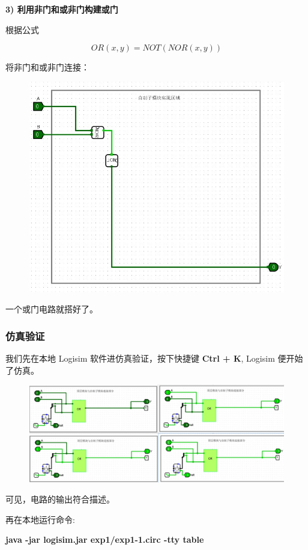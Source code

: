 \documentclass[UTF8]{ctexart}
\begin{document}
\textbf{3) 利用非门和或非门构建或门}

根据公式

\[
    OR(x, y) = NOT(NOR(x, y))
\]

将非门和或非门连接：

\begin{figure}[H]
    \centering
    \includegraphics[width = .6\textwidth]{images/or.jpg}
\end{figure}

一个或门电路就搭好了。


\subsubsection{仿真验证}

我们先在本地 Logisim 软件进仿真验证，按下快捷键 \textbf{Ctrl + K}, Logisim 便开始了仿真。

\begin{figure}[H]
    \centering
    \includegraphics[width = \textwidth]{images/sim.jpg}
\end{figure}

可见，电路的输出符合描述。

再在本地运行命令:

\begin{center}
    \textbf{java -jar logisim.jar exp1/exp1-1.circ -tty table}
\end{center}
\end{document}
